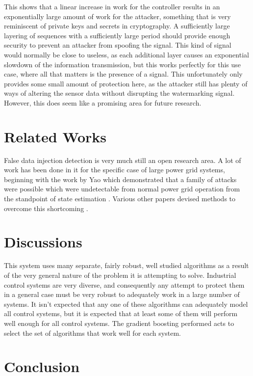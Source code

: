 \documentclass[10pt,twocolumn]{IEEEtran}
\begin{document}
This shows that a linear increase in work for the controller results in an exponentially large amount of work for the attacker, something that is very reminiscent of private keys and secrets in cryptography.
A sufficiently large layering of sequences with a sufficiently large period should provide enough security to prevent an attacker from spoofing the signal.
This kind of signal would normally be close to useless, as each additional layer causes an exponential slowdown of the information transmission, but this works perfectly for this use case, where all that matters is the presence of a signal.
This unfortunately only provides some small amount of protection here, as the attacker still has plenty of ways of altering the sensor data without disrupting the watermarking signal.
However, this does seem like a promising area for future research.

\section{Related Works} \label{sec:related}
False data injection detection is very much still an open research area.
A lot of work has been done in it for the specific case of large power grid systems, beginning with the work by Yao which demonstrated that a family of attacks were possible which were undetectable from normal power grid operation from the standpoint of state estimation \cite{liu2011false}.
Various other papers devised methods to overcome this shortcoming \cite{bobba2010detecting}.

\section{Discussions}\label{sec:discussion}
This system uses many separate, fairly robust, well studied algorithms as a result of the very general nature of the problem it is attempting to solve.
Industrial control systems are very diverse, and consequently any attempt to protect them in a general case must be very robust to adequately work in a large number of systems.
It isn't expected that any one of these algorithms can adequately model all control systems, but it is expected that at least some of them will perform well enough for all control systems.
The gradient boosting performed acts to select the set of algorithms that work well for each system.

\section{Conclusion} \label{sec:conclusion}

\vspace{-0.08in}
\raggedright


\end{document}
